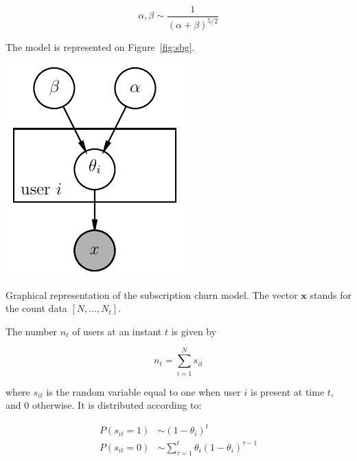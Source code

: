 \documentclass{tufte-book}
\begin{document}
\begin{equation}
  \alpha, \beta \sim \frac{1}{\left(\alpha+\beta\right)^{5/2}}
\end{equation}

The model is represented on Figure~\ref{fig:sbg}.

\begin{marginfigure}
  \centering
  \includegraphics[width=\linewidth]{./figures/shifted_beta_geometric.pdf}
  \caption{Graphical representation of the subscription churn model. The vector $\mathbf{x}$ stands for the
  count data $[N, \dots, N_t]$.\label{fig:sbg}}
\end{marginfigure}

The number $n_t$ of users at an instant $t$ is given by

\begin{equation}
  n_t = \sum_{i=1}^N s_{it}
\end{equation}

where $s_{it}$ is the random variable equal to one when user $i$ is present at time $t$, and $0$ otherwise. It
is distributed according to:

\begin{align*}
  P(s_{it}=1) &\sim \left(1-\theta_i\right)^t\\
  P(s_{it}=0) &\sim \sum_{\tau=1}^t \theta_i \left(1-\theta_i\right)^{\tau-1}
\end{align*}
\end{document}

